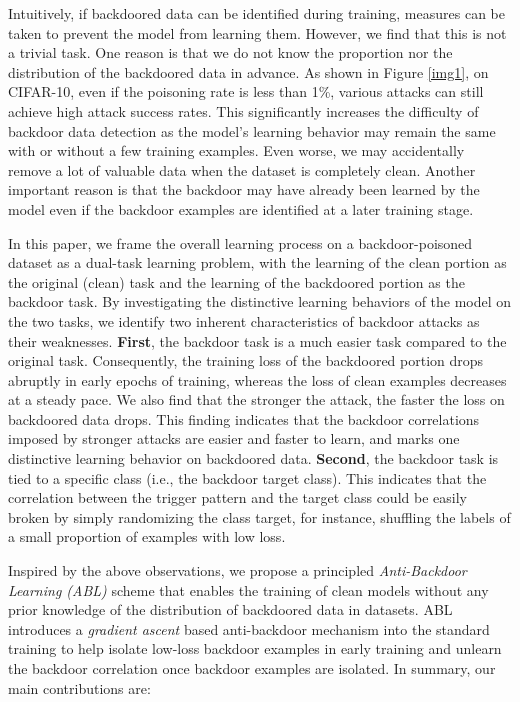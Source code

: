 Intuitively, if backdoored data can be identified during training, measures can be taken to prevent the model from learning them. However, we find that this is not a trivial task. One reason is that we do not know the proportion nor the distribution of the backdoored data in advance. As shown in Figure \ref{img1}, on CIFAR-10, even if the poisoning rate is less than 1\%, various attacks can still achieve high attack success rates. This significantly increases the difficulty of backdoor data detection as the model's learning behavior may remain the same with or without a few training examples. Even worse, we may accidentally remove a lot of valuable data when the dataset is completely clean.
Another important reason is that the backdoor may have already been learned by the model even if the backdoor examples are identified at a later training stage.

In this paper, we frame the overall learning process on a backdoor-poisoned dataset as a dual-task learning problem, with the learning of the clean portion as the original (clean) task and the learning of the backdoored portion as the backdoor task. By investigating the distinctive learning behaviors of the model on the two tasks, we identify two inherent characteristics of backdoor attacks as their weaknesses. \textbf{First}, the backdoor task is a much easier task compared to the original task. Consequently, the training loss of the backdoored portion drops abruptly in early epochs of training, whereas the loss of clean examples decreases at a steady pace. We also find that the stronger the attack, the faster the loss on backdoored data drops. This finding indicates that the backdoor correlations imposed by stronger attacks are easier and faster to learn, and marks one distinctive learning behavior on backdoored data. \textbf{Second}, the backdoor task is tied to a specific class (i.e., the backdoor target class). This indicates that the correlation between the trigger pattern and the target class could be easily broken by simply randomizing the class target, for instance, shuffling the labels of a small proportion of examples with low loss.

Inspired by the above observations, we propose a principled \emph{Anti-Backdoor Learning (ABL)} scheme that enables the training of clean models without any prior knowledge of the distribution of backdoored data in datasets. ABL introduces a \emph{gradient ascent} based anti-backdoor mechanism into the standard training to help isolate low-loss backdoor examples in early training and unlearn the backdoor correlation once backdoor examples are isolated. In summary, our main contributions are:

